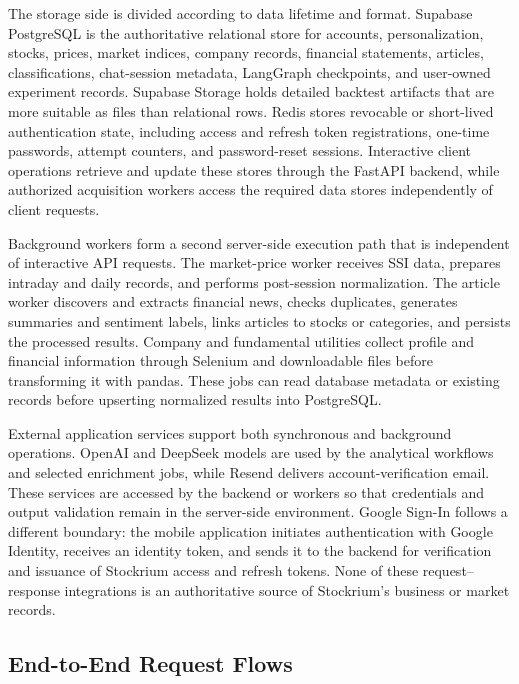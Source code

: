 The storage side is divided according to data lifetime and format. Supabase PostgreSQL is the authoritative relational store for accounts, personalization, stocks, prices, market indices, company records, financial statements, articles, classifications, chat-session metadata, LangGraph checkpoints, and user-owned experiment records. Supabase Storage holds detailed backtest artifacts that are more suitable as files than relational rows. Redis stores revocable or short-lived authentication state, including access and refresh token registrations, one-time passwords, attempt counters, and password-reset sessions. Interactive client operations retrieve and update these stores through the FastAPI backend, while authorized acquisition workers access the required data stores independently of client requests.

Background workers form a second server-side execution path that is independent of interactive API requests. The market-price worker receives SSI data, prepares intraday and daily records, and performs post-session normalization. The article worker discovers and extracts financial news, checks duplicates, generates summaries and sentiment labels, links articles to stocks or categories, and persists the processed results. Company and fundamental utilities collect profile and financial information through Selenium and downloadable files before transforming it with pandas. These jobs can read database metadata or existing records before upserting normalized results into PostgreSQL.

External application services support both synchronous and background operations. OpenAI and DeepSeek models are used by the analytical workflows and selected enrichment jobs, while Resend delivers account-verification email. These services are accessed by the backend or workers so that credentials and output validation remain in the server-side environment. Google Sign-In follows a different boundary: the mobile application initiates authentication with Google Identity, receives an identity token, and sends it to the backend for verification and issuance of Stockrium access and refresh tokens. None of these request--response integrations is an authoritative source of Stockrium's business or market records.

\subsection{End-to-End Request Flows}
\label{subsec:end-to-end-request-flows}

